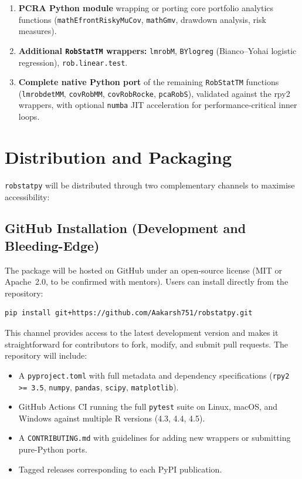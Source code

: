 \documentclass[11pt, a4paper]{article}
\begin{document}
\begin{enumerate}[leftmargin=2em, itemsep=4pt]
  \item \textbf{PCRA Python module} wrapping or porting core portfolio
    analytics functions (\texttt{mathEfrontRiskyMuCov},
    \texttt{mathGmv}, drawdown analysis, risk measures).
  \item \textbf{Additional \texttt{RobStatTM} wrappers:}
    \texttt{lmrobM}, \texttt{BYlogreg} (Bianco--Yohai logistic
    regression), \texttt{rob.linear.test}.
  \item \textbf{Complete native Python port} of the remaining
    \texttt{RobStatTM} functions (\texttt{lmrobdetMM},
    \texttt{covRobMM}, \texttt{covRobRocke}, \texttt{pcaRobS}),
    validated against the rpy2 wrappers, with optional \texttt{numba}
    JIT acceleration for performance-critical inner loops.
\end{enumerate}

\section{Distribution and Packaging}

\texttt{robstatpy} will be distributed through two complementary
channels to maximise accessibility:

\subsection{GitHub Installation (Development and Bleeding-Edge)}

The package will be hosted on GitHub under an open-source license
(MIT or Apache~2.0, to be confirmed with mentors).
Users can install directly from the repository:

\begin{lstlisting}[style=python, caption={GitHub installation}, numbers=none]
pip install git+https://github.com/Aakarsh751/robstatpy.git
\end{lstlisting}

\noindent
This channel provides access to the latest development version and
makes it straightforward for contributors to fork, modify, and submit
pull requests.
The repository will include:
\begin{itemize}[leftmargin=1.5em, itemsep=2pt]
  \item A \texttt{pyproject.toml} with full metadata and dependency
    specifications (\texttt{rpy2 >= 3.5}, \texttt{numpy},
    \texttt{pandas}, \texttt{scipy}, \texttt{matplotlib}).
  \item GitHub Actions CI running the full \texttt{pytest} suite on
    Linux, macOS, and Windows against multiple R versions (4.3, 4.4,
    4.5).
  \item A \texttt{CONTRIBUTING.md} with guidelines for adding new
    wrappers or submitting pure-Python ports.
  \item Tagged releases corresponding to each PyPI publication.
\end{itemize}
\end{document}
